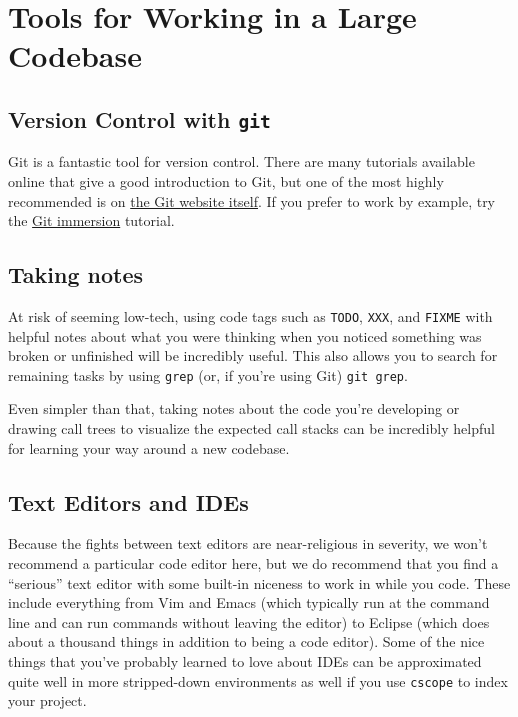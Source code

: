 \chapter{Tools for Working in a Large Codebase}
\label{LargeCodebases}

\section{Version Control with \texttt{git}}

Git is a fantastic tool for version control. There are many tutorials available online that give a good introduction to Git, but one of the most highly recommended is on \hyperref{http://git-scm.com/book}{}{}{the Git website itself}. If you prefer to work by example, try the \hyperref{http://gitimmersion.com/}{}{}{Git immersion} tutorial.

\section{Taking notes}

At risk of seeming low-tech, using code tags such as \texttt{TODO}, \texttt{XXX}, and \texttt{FIXME} with helpful notes about what you were thinking when you noticed something was broken or unfinished will be incredibly useful. This also allows you to search for remaining tasks by using \texttt{grep} (or, if you're using Git) \texttt{git grep}.

Even simpler than that, taking notes about the code you're developing or drawing call trees to visualize the expected call stacks can be incredibly helpful for learning your way around a new codebase.

\section{Text Editors and IDEs}

Because the fights between text editors are near-religious in severity, we won't recommend a particular code editor here, but we do recommend that you find a ``serious'' text editor with some built-in niceness to work in while you code. These include everything from Vim and Emacs (which typically run at the command line and can run commands without leaving the editor) to Eclipse (which does about a thousand things in addition to being a code editor). Some of the nice things that you've probably learned to love about IDEs can be approximated quite well in more stripped-down environments as well if you use \texttt{cscope} to index your project.

